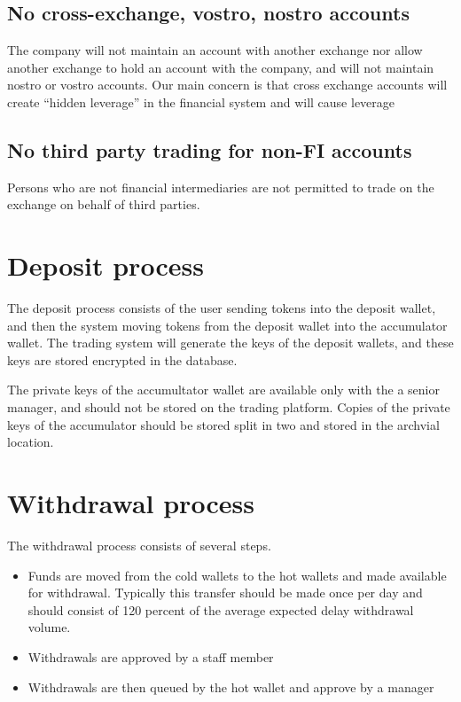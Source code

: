 \subsection{No cross-exchange, vostro, nostro accounts}
The company will not maintain an account with another exchange nor
allow another exchange to hold an account with the company, and will
not maintain nostro or vostro accounts.  Our main concern is that
cross exchange accounts will create ``hidden leverage'' in the
financial system and will cause leverage

\subsection{No third party trading for non-FI accounts}
Persons who are not financial intermediaries are not permitted to
trade on the exchange on behalf of third parties.

\section{Deposit process}
The deposit process consists of the user sending tokens into the
deposit wallet, and then the system moving tokens from the deposit
wallet into the accumulator wallet.  The trading system will generate
the keys of the deposit wallets, and these keys are stored encrypted
in the database.

The private keys of the accumultator wallet are available only with
the a senior manager, and should not be stored on the trading
platform.  Copies of the private keys of the accumulator should be
stored split in two and stored in the archvial location.

\section{Withdrawal process}

The withdrawal process consists of several steps.
\begin{itemize}
  \item Funds are moved from the cold wallets to the hot wallets and
    made available for withdrawal.  Typically this transfer should be
    made once per day and should consist of 120 percent of the average
    expected delay withdrawal volume.
  \item Withdrawals are approved by a staff member
  \item Withdrawals are then queued by the hot wallet and approve by a manager
\end{itemize}


